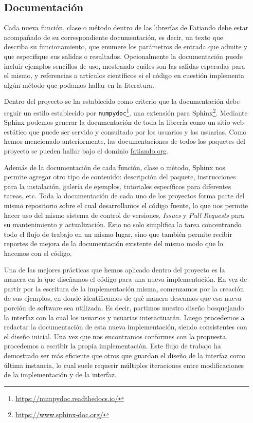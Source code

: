 \subsection{Documentación}

Cada nueva función, clase o método dentro de las librerías de Fatiando debe
estar acompañado de su correspondiente documentación, es decir, un texto que
describa su funcionamiento, que enumere los parámetros de entrada que admite
y que especifique sus salidas o resultados.
Opcionalmente la documentación puede incluir ejemplos sencillos de uso,
mostrando cuáles son las salidas esperadas para el mismo, y referencias
a artículos científicos si el código en cuestión implementa algún método que
podamos hallar en la literatura.

Dentro del proyecto se ha establecido como criterio que la documentación debe
seguir un estilo establecido por
\texttt{numpydoc}\footnote{\url{https://numpydoc.readthedocs.io/}},
una extensión para Sphinx\footnote{\url{https://www.sphinx-doc.org/}}.
Mediante Sphinx podemos generar la documentación de toda la librería como un
sitio web estático que puede ser servido y consultado por los usuarios y las
usuarias.
Como hemos mencionado anteriormente, las documentaciones de todos los paquetes
del proyecto se pueden hallar bajo el dominio
\href{https://www.fatiando.org}{fatiando.org}.

Además de la documentación de cada función, clase o método, Sphinx nos permite
agregar otro tipo de contenido: descripción del paquete, instrucciones
para la instalación, galería de ejemplos, tutoriales específicos para
diferentes tareas, etc.
Toda la documentación de cada uno de los proyectos forma parte del mismo
repositorio sobre el cual desarrollamos el código fuente, lo que nos permite
hacer uso del mismo sistema de control de versiones, \emph{Issues} y \emph{Pull
Requests} para su mantenimiento y actualización.
Esto no solo simplifica la tarea concentrando todo el flujo de trabajo en un
mismo lugar, sino que también permite recibir reportes de mejora de la
documentación existente del mismo modo que lo hacemos con el código.

Una de las mejores prácticas que hemos aplicado dentro del proyecto es la
manera en la que diseñamos el código para una nueva implementación.
En vez de partir por la escritura de la implementación misma, comenzamos por la
creación de sus ejemplos, en donde identificamos de qué manera deseamos que esa
nueva porción de software sea utilizada.
Es decir, partimos nuestro diseño bosquejando la interfaz con la cual los
usuarios y usuarias interactuarán.
Luego procedemos a redactar la documentación de esta nueva implementación,
siendo consistentes con el diseño inicial.
Una vez que nos encontramos conformes con la propuesta, procedemos a escribir
la propia implementación.
Este flujo de trabajo ha demostrado ser más eficiente que otros que guardan el
diseño de la interfaz como última instancia, lo cual suele requerir múltiples
iteraciones entre modificaciones de la implementación y de la interfaz.


